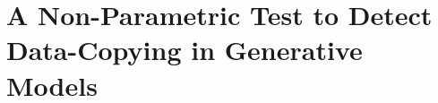 \graphicspath{{./chapters/chapter2/}}
\chapter{A Non-Parametric Test to Detect Data-Copying in Generative Models}





